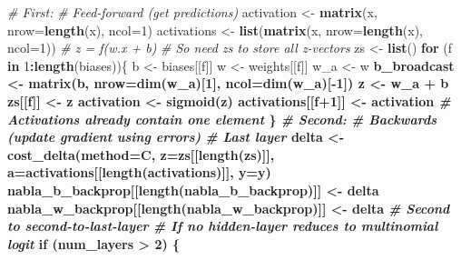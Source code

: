 \documentclass[]{book}
\newenvironment{Shaded}{\begin{snugshade}}{\end{snugshade}}
\newcommand{\CommentTok}[1]{\textcolor[rgb]{0.56,0.35,0.01}{\textit{#1}}}
\newcommand{\ControlFlowTok}[1]{\textcolor[rgb]{0.13,0.29,0.53}{\textbf{#1}}}
\newcommand{\DataTypeTok}[1]{\textcolor[rgb]{0.13,0.29,0.53}{#1}}
\newcommand{\DecValTok}[1]{\textcolor[rgb]{0.00,0.00,0.81}{#1}}
\newcommand{\KeywordTok}[1]{\textcolor[rgb]{0.13,0.29,0.53}{\textbf{#1}}}
\newcommand{\NormalTok}[1]{#1}
\newcommand{\OperatorTok}[1]{\textcolor[rgb]{0.81,0.36,0.00}{\textbf{#1}}}
\newcommand{\StringTok}[1]{\textcolor[rgb]{0.31,0.60,0.02}{#1}}
\begin{document}
\begin{Shaded}
\begin{Highlighting}[]
  \CommentTok{# First:}
  \CommentTok{# Feed-forward (get predictions)}
\NormalTok{  activation <-}\StringTok{ }\KeywordTok{matrix}\NormalTok{(x, }\DataTypeTok{nrow=}\KeywordTok{length}\NormalTok{(x), }\DataTypeTok{ncol=}\DecValTok{1}\NormalTok{)}
\NormalTok{  activations <-}\StringTok{ }\KeywordTok{list}\NormalTok{(}\KeywordTok{matrix}\NormalTok{(x, }\DataTypeTok{nrow=}\KeywordTok{length}\NormalTok{(x), }\DataTypeTok{ncol=}\DecValTok{1}\NormalTok{))}
  \CommentTok{# z = f(w.x + b)}
  \CommentTok{# So need zs to store all z-vectors}
\NormalTok{  zs <-}\StringTok{ }\KeywordTok{list}\NormalTok{()}
  \ControlFlowTok{for}\NormalTok{ (f }\ControlFlowTok{in} \DecValTok{1}\OperatorTok{:}\KeywordTok{length}\NormalTok{(biases))\{}
\NormalTok{    b <-}\StringTok{ }\NormalTok{biases[[f]]}
\NormalTok{    w <-}\StringTok{ }\NormalTok{weights[[f]]}
\NormalTok{    w_a <-}\StringTok{ }\NormalTok{w}\OperatorTok{%*%}\NormalTok{activation}
\NormalTok{    b_broadcast <-}\StringTok{ }\KeywordTok{matrix}\NormalTok{(b, }\DataTypeTok{nrow=}\KeywordTok{dim}\NormalTok{(w_a)[}\DecValTok{1}\NormalTok{], }\DataTypeTok{ncol=}\KeywordTok{dim}\NormalTok{(w_a)[}\OperatorTok{-}\DecValTok{1}\NormalTok{])}
\NormalTok{    z <-}\StringTok{ }\NormalTok{w_a }\OperatorTok{+}\StringTok{ }\NormalTok{b}
\NormalTok{    zs[[f]] <-}\StringTok{ }\NormalTok{z}
\NormalTok{    activation <-}\StringTok{ }\KeywordTok{sigmoid}\NormalTok{(z)}
\NormalTok{    activations[[f}\OperatorTok{+}\DecValTok{1}\NormalTok{]] <-}\StringTok{ }\NormalTok{activation  }\CommentTok{# Activations already contain one element}
\NormalTok{  \}}
  \CommentTok{# Second:}
  \CommentTok{# Backwards (update gradient using errors)}
  \CommentTok{# Last layer}
\NormalTok{  delta <-}\StringTok{ }\KeywordTok{cost_delta}\NormalTok{(}\DataTypeTok{method=}\NormalTok{C, }\DataTypeTok{z=}\NormalTok{zs[[}\KeywordTok{length}\NormalTok{(zs)]], }\DataTypeTok{a=}\NormalTok{activations[[}\KeywordTok{length}\NormalTok{(activations)]], }\DataTypeTok{y=}\NormalTok{y)}
\NormalTok{  nabla_b_backprop[[}\KeywordTok{length}\NormalTok{(nabla_b_backprop)]] <-}\StringTok{ }\NormalTok{delta}
\NormalTok{  nabla_w_backprop[[}\KeywordTok{length}\NormalTok{(nabla_w_backprop)]] <-}\StringTok{ }\NormalTok{delta }\OperatorTok{%*%}\StringTok{ }\KeywordTok{t}\NormalTok{(activations[[}\KeywordTok{length}\NormalTok{(activations)}\OperatorTok{-}\DecValTok{1}\NormalTok{]])}
  \CommentTok{# Second to second-to-last-layer}
  \CommentTok{# If no hidden-layer reduces to multinomial logit}
  \ControlFlowTok{if}\NormalTok{ (num_layers }\OperatorTok{>}\StringTok{ }\DecValTok{2}\NormalTok{) \{}
}}
\end{Highlighting}
\end{Shaded}
\end{document}
